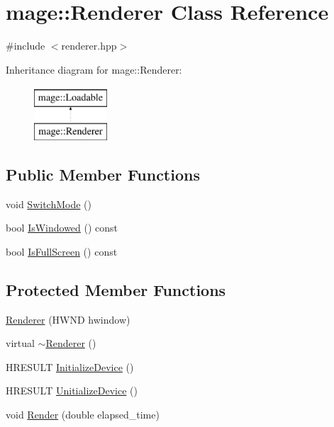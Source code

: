 \hypertarget{classmage_1_1_renderer}{}\section{mage\+:\+:Renderer Class Reference}
\label{classmage_1_1_renderer}


{\ttfamily \#include $<$renderer.\+hpp$>$}

Inheritance diagram for mage\+:\+:Renderer\+:\begin{figure}[H]
\begin{center}
\leavevmode
\includegraphics[height=2.000000cm]{classmage_1_1_renderer}
\end{center}
\end{figure}
\subsection*{Public Member Functions}
\begin{DoxyCompactItemize}
\item 
void \hyperlink{classmage_1_1_renderer_affae177123ead5eb15b2fb5957d5651e}{Switch\+Mode} ()
\item 
bool \hyperlink{classmage_1_1_renderer_a1de1804c1eedae7dc12435a520a10b9c}{Is\+Windowed} () const
\item 
bool \hyperlink{classmage_1_1_renderer_a5ae3220e19c68f47a8e4d55e3ced4694}{Is\+Full\+Screen} () const
\end{DoxyCompactItemize}
\subsection*{Protected Member Functions}
\begin{DoxyCompactItemize}
\item 
\hyperlink{classmage_1_1_renderer_a762dcda433c319af237d1dfd9bc6095f}{Renderer} (H\+W\+ND hwindow)
\item 
virtual \hyperlink{classmage_1_1_renderer_a997e041f28cc71d069d1ab7d29fe6ced}{$\sim$\+Renderer} ()
\item 
H\+R\+E\+S\+U\+LT \hyperlink{classmage_1_1_renderer_a176e6ae84ec4490f72c32a352f768c9b}{Initialize\+Device} ()
\item 
H\+R\+E\+S\+U\+LT \hyperlink{classmage_1_1_renderer_ace70af3597f8b8f82c1c36a94c065b50}{Unitialize\+Device} ()
\item 
void \hyperlink{classmage_1_1_renderer_a95ac55eb4cc79a5712a50bfb78f67fe6}{Render} (double elapsed\+\_\+time)
\end{DoxyCompactItemize}
